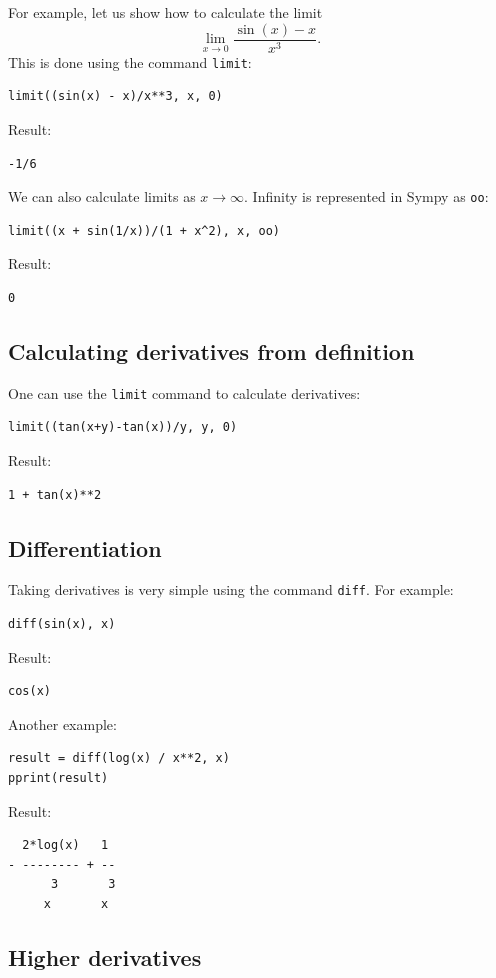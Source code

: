 \documentclass[article,A4,12pt]{llncs}
\begin{document}
\noindent
For example, let us show how to calculate the limit
$$
\lim_{x \rightarrow 0} \frac{\sin(x) - x}{x^3}.
$$
This is done using the command {\tt limit}:
\begin{verbatim}
limit((sin(x) - x)/x**3, x, 0)
\end{verbatim}
Result:
\begin{verbatim}
-1/6
\end{verbatim}
We can also calculate limits as $x \rightarrow \infty$. Infinity is represented 
in Sympy as {\tt oo}:
\begin{verbatim}
limit((x + sin(1/x))/(1 + x^2), x, oo)
\end{verbatim}
Result:
\begin{verbatim}
0
\end{verbatim}

\subsection{Calculating derivatives from definition}

One can use the {\tt limit} command to calculate derivatives:
\begin{verbatim}
limit((tan(x+y)-tan(x))/y, y, 0)
\end{verbatim}
Result:
\begin{verbatim}
1 + tan(x)**2
\end{verbatim}

\subsection{Differentiation}

Taking derivatives is very simple using the command {\tt diff}. For example:
\begin{verbatim}
diff(sin(x), x)
\end{verbatim}
Result:
\begin{verbatim}
cos(x)
\end{verbatim}
Another example:
\begin{verbatim}
result = diff(log(x) / x**2, x)
pprint(result)
\end{verbatim}
Result:
\begin{verbatim}
  2*log(x)   1 
- -------- + --
      3       3
     x       x 
\end{verbatim}

\subsection{Higher derivatives}
\end{document}
